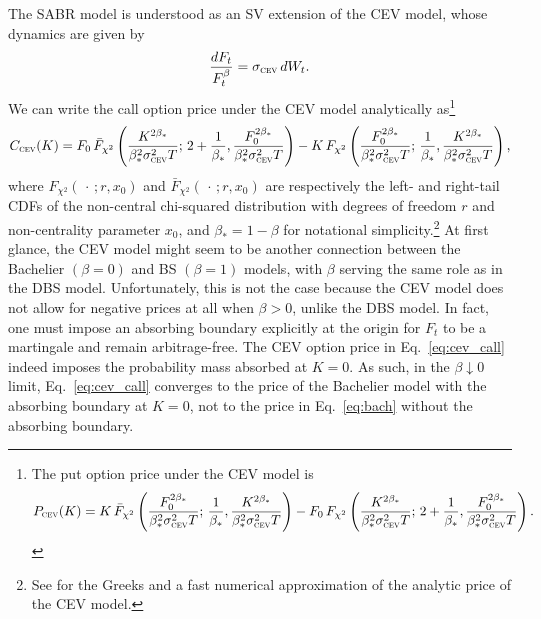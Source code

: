\documentclass[a4paper,review]{elsarticle}
\newcommand{\sigmacev}{\sigma_\textsc{cev}}
\newcommand{\cev}{\textsc{cev}}
\newcommand{\betac}{\beta_\ast}
\newcommand{\betacpow}[1]{\beta_\ast^{#1}}
\newcommand{\ncx}{{\chi^2}}
\begin{document}
The SABR model is understood as an SV extension of the CEV model, whose dynamics are given by
\begin{equation} \label{eq:cev}
	\frac{d F_t}{F_t^\beta} = \sigmacev\, dW_t.
\end{equation}
We can write the call option price under the CEV model analytically as\footnote{The put option price under the CEV model is
	$$P_\cev(K) = K \, \bar{F}_\ncx \left(\frac{F_0^{2\betac}}{\betacpow{2}\sigmacev^2 T};\, \frac1{\betac},\frac{K^{2\betac}}{\betacpow{2}\sigmacev^2 T}\right) - F_0\, F_\ncx \left(\frac{K^{2\betac}}{\betacpow{2}\sigmacev^2 T}; \,2+\frac1{\betac},\frac{F_0^{2\betac}}{\betacpow{2}\sigmacev^2 T}\right).$$
} 
\begin{equation} \label{eq:cev_call}
	C_\cev(K) = F_0 \, \bar{F}_\ncx \left(\frac{K^{2\betac}}{\betacpow{2}\sigmacev^2 T}; \,2+\frac1{\betac},\frac{F_0^{2\betac}}{\betacpow{2}\sigmacev^2 T}\right) - K \, F_\ncx \left(\frac{F_0^{2\betac}}{\betacpow{2}\sigmacev^2 T};\, \frac1{\betac},\frac{K^{2\betac}}{\betacpow{2}\sigmacev^2 T}\right), 
\end{equation}
where $F_\ncx(\,\cdot\,;r, x_0)$ and $\bar{F}_\ncx(\,\cdot\,;r,x_0)$ are respectively the left- and right-tail CDFs of the non-central chi-squared distribution with degrees of freedom $r$ and non-centrality parameter $x_0$, and $\betac = 1-\beta$ for notational simplicity.\footnote{See \citet{larguinho2013cev} for the Greeks and a fast numerical approximation of the analytic price of the CEV model.} At first glance, the CEV model might seem to be another connection between the Bachelier $(\beta=0)$ and BS $(\beta=1)$ models, with $\beta$ serving the same role as in the DBS model. Unfortunately, this is not the case because the CEV model does not allow for negative prices at all when $\beta>0$, unlike the DBS model. In fact, one must impose an absorbing boundary explicitly at the origin for $F_t$ to be a martingale and remain arbitrage-free. The CEV option price in Eq.~\eqref{eq:cev_call} indeed imposes the probability mass absorbed at $K=0$. As such, in the $\beta\downarrow 0$ limit, Eq.~\eqref{eq:cev_call} converges to the price of the Bachelier model with the absorbing boundary at $K=0$, not to the price in Eq.~\eqref{eq:bach} without the absorbing boundary.
\end{document}
